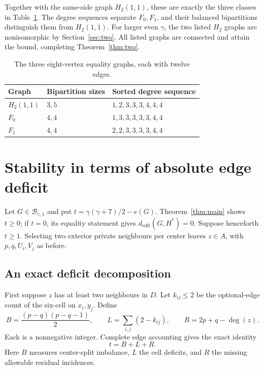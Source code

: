 \documentclass[11pt]{article}
\theoremstyle{definition}
\theoremstyle{remark}
\newcommand{\e}{e}
\begin{document}
Together with the same-side graph $H_2(1,1)$, these are exactly the
three classes in Table~\ref{tab:exceptions}. The degree sequences
separate $F_0,F_1$, and their balanced bipartitions distinguish them
from $H_2(1,1)$. For larger even $\gamma$, the two listed $H_2$ graphs
are nonisomorphic by Section~\ref{sec:two}. All listed graphs are
connected and attain the bound, completing Theorem~\ref{thm:two}.

\begin{table}[htbp]
\centering
\begin{tabular}{lll}
\toprule
Graph & Bipartition sizes & Sorted degree sequence\\
\midrule
$H_2(1,1)$ & $3,5$ & $1,2,3,3,3,4,4,4$\\
$F_0$ & $4,4$ & $1,3,3,3,3,3,4,4$\\
$F_1$ & $4,4$ & $2,2,3,3,3,3,4,4$\\
\bottomrule
\end{tabular}
\caption{The three eight-vertex equality graphs, each with twelve edges.}
\label{tab:exceptions}
\end{table}

\section{Stability in terms of absolute edge deficit}\label{sec:stability}

Let $G\in\mathcal B_{\gamma,1}$ and put
$t=\gamma(\gamma+7)/2-\e(G)$. Theorem~\ref{thm:main} shows $t\ge0$;
if $t=0$, its equality statement gives $d_{\mathrm{edit}}(G,H^*)=0$.
Suppose henceforth $t\ge1$. Selecting two exterior private neighbours
per center leaves $z\in A$, with $p,q,U_i,V_j$ as before.

\subsection{An exact deficit decomposition}

First suppose $z$ has at least two neighbours in $D$. Let $k_{ij}\le2$
be the optional-edge count of the six-cell on $x_i,y_j$. Define
\[
 B=\frac{(p-q)(p-q-1)}2,\qquad
 L=\sum_{i,j}(2-k_{ij}),\qquad R=2p+q-\deg(z).
\]
Each is a nonnegative integer. Complete edge accounting gives the exact
identity
\begin{equation}\label{eq:slack}
 t=B+L+R.
\end{equation}
Here $B$ measures center-split imbalance, $L$ the cell deficits, and $R$
the missing allowable residual incidences.
\end{document}
